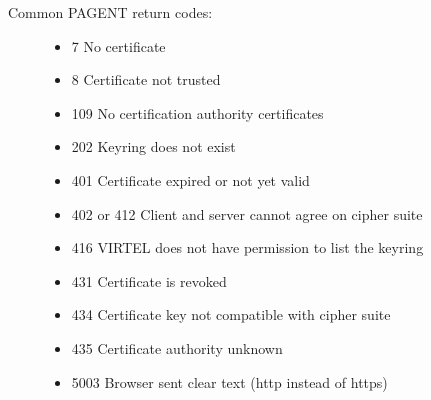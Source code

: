 \documentclass[letterpaper,10pt,english]{sphinxmanual}
\begin{document}
\begin{description}
\item[{Common PAGENT return codes:}] \leavevmode\begin{itemize}
\item {} 
7 No certificate

\item {} 
8 Certificate not trusted

\item {} 
109 No certification authority certificates

\item {} 
202 Keyring does not exist

\item {} 
401 Certificate expired or not yet valid

\item {} 
402 or 412 Client and server cannot agree on cipher suite

\item {} 
416 VIRTEL does not have permission to list the keyring

\item {} 
431 Certificate is revoked

\item {} 
434 Certificate key not compatible with cipher suite

\item {} 
435 Certificate authority unknown

\item {} 
5003 Browser sent clear text (http instead of https)

\end{itemize}

\end{description}
\end{document}
